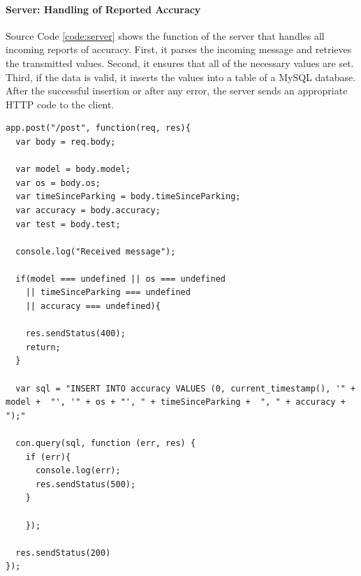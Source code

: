 \paragraph{Server: Handling of Reported Accuracy} Source Code \ref{code:server} shows the function of the server that handles all incoming reports of accuracy. First, it parses the incoming message and retrieves the transmitted values. Second, it ensures that all of the necessary values are set. Third, if the data is valid, it inserts the values into a table of a MySQL database. After the successful insertion or after any error, the server sends an appropriate HTTP code to the client.


\begin{lstlisting}[style=JavaScript, caption={Server: Handling of reported accuracy}, label={code:server}]
app.post("/post", function(req, res){
  var body = req.body;

  var model = body.model;
  var os = body.os;
  var timeSinceParking = body.timeSinceParking;
  var accuracy = body.accuracy;
  var test = body.test;

  console.log("Received message");

  if(model === undefined || os === undefined
    || timeSinceParking === undefined
    || accuracy === undefined){

    res.sendStatus(400);
    return;
  }

  var sql = "INSERT INTO accuracy VALUES (0, current_timestamp(), '" + model +  "', '" + os + "', " + timeSinceParking +  ", " + accuracy +  ");"

  con.query(sql, function (err, res) {
    if (err){
      console.log(err);
      res.sendStatus(500);
    }

    });

  res.sendStatus(200)
});
\end{lstlisting}{}